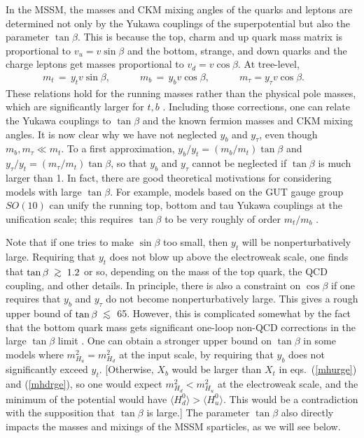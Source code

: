 \documentclass[11pt]{article}
\def\beq{\begin{eqnarray}}
\def\eeq{\end{eqnarray}}
\def\centeron#1#2{{\setbox0=\hbox{#1}\setbox1=\hbox{#2}\ifdim
\wd1>\wd0\kern.5\wd1\kern-.5\wd0\fi
\copy0\kern-.5\wd0\kern-.5\wd1\copy1\ifdim\wd0>\wd1
\kern.5\wd0\kern-.5\wd1\fi}}
\def\ltap{\;\centeron{\raise.35ex\hbox{$<$}}{\lower.65ex\hbox{$\sim$}}\;}
\def\gtap{\;\centeron{\raise.35ex\hbox{$>$}}{\lower.65ex\hbox{$\sim$}}\;}
\def\gsim{\mathrel{\gtap}}
\def\lsim{\mathrel{\ltap}}
\begin{document}
In the MSSM, the masses and CKM mixing angles of the quarks and leptons 
are determined not only by the Yukawa couplings of the superpotential but 
also the parameter $\tan\beta$. This is because the top, charm and up 
quark mass matrix is proportional to $v_u = v \sin\beta$ and the bottom, 
strange, and down quarks and the charge leptons get masses proportional to 
$v_d = v \cos\beta$. At tree-level,
\beq
m_t \,=\, y_t v \sin\beta
,
\qquad\quad
m_b \,=\, y_b v \cos\beta
,
\qquad\quad
m_\tau = y_\tau v \cos\beta .\phantom{xxx}
\label{eq:ytbtaumtbtau}
\eeq
These relations hold for the running masses rather than the physical pole 
masses, which are significantly larger for $t,b$ \cite{polecat}. Including 
those corrections, one can relate the Yukawa couplings to $\tan\beta$ and 
the known fermion masses and CKM mixing angles. It is now clear why we 
have not neglected $y_b$ and $y_\tau$, even though $m_b,m_\tau\ll m_t$. To 
a first approximation, $y_b/y_t = (m_b/m_t)\tan\beta$ and $y_\tau/y_t = 
(m_\tau/m_t)\tan\beta$, so that $y_b$ and $y_\tau$ cannot be neglected if 
$\tan\beta$ is much larger than 1. In fact, there are good theoretical 
motivations for considering models with large $\tan\beta$. For example, 
models based on the GUT gauge group $SO(10)$ 
can unify the running top, bottom and tau Yukawa couplings at the 
unification scale; this requires $\tan\beta$ to be very roughly of order 
$m_t/m_b$ \cite{so10,copw}.

Note that if one tries to make $\sin\beta$ too small, then $y_t$ will be 
nonperturbatively large. Requiring that $y_t$ does not blow up above the 
electroweak scale, one finds that $\tan\beta \gsim 1.2$ or so, depending 
on the mass of the top quark, the QCD coupling, and other details. In 
principle, there is also a constraint on $\cos\beta$ if one requires 
that $y_b$ and $y_\tau$ do not become nonperturbatively large. This 
gives a rough upper bound of $\tan\beta \lsim$ 65. However, this is 
complicated somewhat by the fact that the bottom quark mass gets 
significant one-loop non-QCD corrections in the large $\tan\beta$ limit 
\cite{copw}. One can obtain a stronger upper bound on $\tan\beta$ in some 
models where $m_{H_u}^2 = m_{H_d}^2$ at the input scale, by requiring that 
$y_b$ does not significantly exceed $y_t$. [Otherwise, $X_b$ would be 
larger than $X_t$ in eqs.~(\ref{mhurge}) and (\ref{mhdrge}), so one would 
expect $m_{H_d}^2 < m_{H_u}^2$ at the electroweak scale, and the minimum 
of the potential would have $\langle H_d^0 \rangle > \langle H_u^0 
\rangle$. This would be a contradiction with the supposition that 
$\tan\beta$ is large.] The parameter $\tan\beta$ also 
directly impacts the masses and mixings of the MSSM sparticles,
as we will see below.
\end{document}
